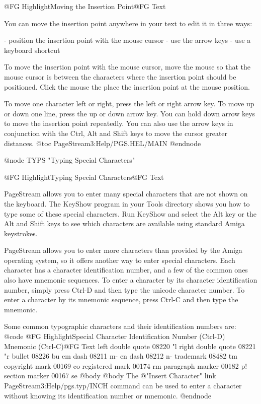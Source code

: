 @{FG Highlight}Moving the Insertion Point@{FG Text}

You can move the insertion point anywhere in your text to edit it in
three ways:

- position the insertion point with the mouse cursor
- use the arrow keys
- use a keyboard shortcut

To move the insertion point with the mouse cursor, move the mouse so that
the mouse cursor is between the characters where the insertion point
should be positioned. Click the mouse the place the insertion point at
the mouse position.

To move one character left or right, press the left or right arrow key.
To move up or down one line, press the up or down arrow key. You can hold
down arrow keys to move the insertion point repeatedly. You can also use
the arrow keys in conjunction with the Ctrl, Alt and Shift keys to move
the cursor greater distances.
@toc PageStream3:Help/PGS.HEL/MAIN
@endnode

@node TYPS "Typing Special Characters"

@{FG Highlight}Typing Special Characters@{FG Text}

PageStream allows you to enter many special characters that are not shown
on the keyboard. The KeyShow program in your Tools directory shows you
how to type some of these special characters. Run KeyShow and select the
Alt key or the Alt and Shift keys to see which characters are available
using standard Amiga keystrokes.

PageStream allows you to enter more characters than provided by the Amiga
operating system, so it offers another way to enter special characters.
Each character has a character identification number, and a few of the
common ones also have mnemonic sequences. To enter a character by its
character identification number, simply press Ctrl-D and then type the
unicode character number. To enter a character by its mnemonic sequence,
press Ctrl-C and then type the mnemonic.

Some common typographic characters and their identification numbers are:
@{code}
@{FG Highlight}Special Character   Identification Number (Ctrl-D)  Mnemonic (Ctrl-C)@{FG Text}
left double quote   08220                           "l
right double quote  08221                           "r
bullet              08226                           bu
em dash             08211                           m-
en dash             08212                           n-
trademark           08482                           tm
copyright mark      00169                           co
registered mark     00174                           rm
paragraph marker    00182                           p!
section marker      00167                           se
@{body}
@{body}
The @{"Insert Character" link PageStream3:Help/pgs.typ/INCH} command can be used to enter a character without
knowing its identification number or mnemonic.
@endnode

